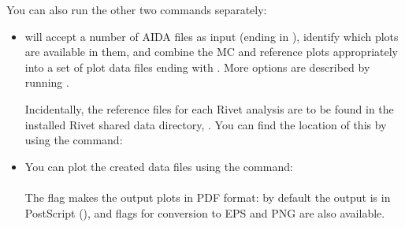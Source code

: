 You can also run the other two commands separately:
%
\begin{itemize}
\item {} will accept a number of AIDA files as input (ending in
), identify which plots are available in them, and combine the MC
and reference plots appropriately into a set of plot data files ending with
. More options are described by running .

Incidentally, the reference files for each Rivet analysis are to be found in the
installed Rivet shared data directory, . You
can find the location of this by using the  command:\\

\item You can plot the created data files using the  command:\\
\\
The  flag makes the output plots in PDF format: by default the output
is in PostScript (), and flags for conversion to EPS and PNG are also
available.
\end{itemize}
